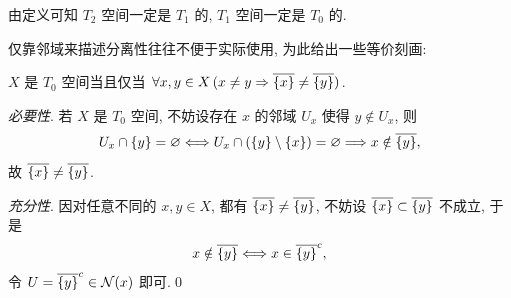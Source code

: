     \begin{figure}[!htb]
        \centering
         \quad {} \quad {}
    \end{figure}

    由定义可知 $ T_2 $ 空间一定是 $ T_1 $ 的, $ T_1 $ 空间一定是 $ T_0 $ 的.

    仅靠邻域来描述分离性往往不便于实际使用, 为此给出一些等价刻画:

    \begin{Proposition}[$ T_0 $空间的刻画]
        $ X $ 是 $ T_0 $ 空间当且仅当 $ \forall x,y\in X\,(x\ne y\Rightarrow\overline{\left\{ x \right\}}\ne\overline{\left\{ y \right\}}) $.
    \end{Proposition}
    \begin{Proof}
        \textsl{必要性}. 若 $ X $ 是 $ T_0 $ 空间, 不妨设存在 $ x $ 的邻域 $ U_x $ 使得 $ y\notin U_x $, 则
        \[
            U_x\cap\left\{ y \right\}=\varnothing\Longleftrightarrow U_x\cap(\left\{ y \right\}\setminus\left\{ x \right\})=\varnothing\Longrightarrow x\notin\overline{\left\{ y \right\}},
        \]
        故 $ \overline{\left\{ x \right\}}\ne\overline{\left\{ y \right\}} $.

        \textsl{充分性}. 因对任意不同的 $ x,y\in X $, 都有 $ \overline{\left\{ x \right\}}\ne\overline{\left\{ y \right\}} $, 不妨设 $ \overline{\left\{ x \right\}}\subset\overline{\left\{ y \right\}} $ 不成立, 于是
        \[
            x\notin\overline{\left\{ y \right\}}\Longleftrightarrow x\in\overline{\left\{ y \right\}}^c,
        \]
        令 $ U=\overline{\left\{ y \right\}}^c\in\mathcal{N}(x) $ 即可.\qed
    \end{Proof}

